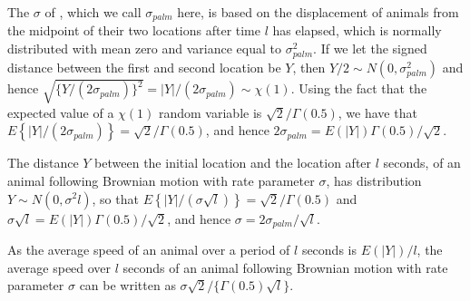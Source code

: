 \documentclass[useAMS, usenatbib, referee]{biom}\usepackage[]{graphicx}\usepackage[]{color}
\begin{document}
The $\sigma$ of \cite{Stevenson+al:19}, which we call $\sigma_{palm}$ here, is based on the displacement of animals from the midpoint of their two locations after time $l$ has elapsed, which is normally distributed with mean zero and variance equal to $\sigma_{palm}^2$. If we let the signed distance between the first and second location be $Y$, then $Y/2\sim N(0,\sigma_{palm}^2)$ and hence $\sqrt{\{Y/(2\sigma_{palm})\}^2}=|Y|/(2\sigma_{palm})\sim\chi(1)$. Using the fact that the expected value of a $\chi(1)$ random variable is $\sqrt{2}/\Gamma(0.5)$, we have that $E\left\{|Y|/(2\sigma_{palm})\right\}=\sqrt{2}/\Gamma(0.5)$, and hence $2\sigma_{palm}=E(|Y|)\Gamma(0.5)/\sqrt{2}$.

The distance $Y$ between the initial location and the location after $l$ seconds, of an animal following Brownian motion with rate parameter $\sigma$, has distribution $Y\sim N(0,\sigma^2l)$, so that $E\left\{|Y|/(\sigma\sqrt{l})\right\}=\sqrt{2}/\Gamma(0.5)$ and $\sigma\sqrt{l}=E(|Y|)\Gamma(0.5)/\sqrt{2}$, and hence $\sigma=2\sigma_{palm}/\sqrt{l}$.

As the average speed of an animal over a period of $l$ seconds is $E(|Y|)/l$, the average speed over $l$ seconds of an animal following Brownian motion with rate parameter $\sigma$ can be written as $\sigma\sqrt{2}/\{\Gamma(0.5)\sqrt{l}\}$.




\end{document}
